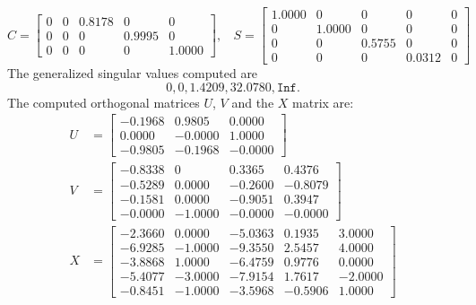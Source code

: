 \begin{example}
{\begin{enumerate}[(1).]
            \begin{equation*}
                C = \begin{bmatrix}
                    0 & 0 & 0.8178 & 0 & 0 \\
                    0 & 0 & 0 & 0.9995 & 0 \\
                    0 & 0 & 0 & 0 & 1.0000
                \end{bmatrix}, \ \ \ \
                S = \begin{bmatrix}
                    1.0000 & 0 & 0 & 0 & 0 \\
                    0 & 1.0000 & 0 & 0 & 0 \\
                    0 & 0 & 0.5755 & 0 & 0 \\
                    0 & 0 & 0 & 0.0312 & 0
                \end{bmatrix}
            \end{equation*}
            The generalized singular values computed are 
\[
0, 0, 1.4209, 32.0780, \texttt{Inf}.
\] 
The computed orthogonal matrices $U$, $V$ and the $X$ matrix are:
            \begin{align*}
                U &= \begin{bmatrix}
                   -0.1968 &  0.9805 &  0.0000 \\
                    0.0000 & -0.0000 &  1.0000 \\
                   -0.9805 & -0.1968 & -0.0000
                \end{bmatrix} 
                \\
                V &= \begin{bmatrix}
                   -0.8338  &       0 &   0.3365  &  0.4376 \\
                   -0.5289  &  0.0000 &  -0.2600  & -0.8079 \\
                   -0.1581  &  0.0000 &  -0.9051  &  0.3947 \\
                   -0.0000  & -1.0000 &  -0.0000  & -0.0000 
                \end{bmatrix} 
                \\ 
                X &= \begin{bmatrix}
                   -2.3660  &  0.0000 &  -5.0363  &  0.1935 &   3.0000 \\
                   -6.9285  & -1.0000 &  -9.3550  &  2.5457 &   4.0000 \\
                   -3.8868  &  1.0000 &  -6.4759  &  0.9776 &   0.0000 \\
                   -5.4077  & -3.0000 &  -7.9154  &  1.7617 &  -2.0000 \\
                   -0.8451  & -1.0000 &  -3.5968  & -0.5906 &   1.0000
                \end{bmatrix}
           \end{align*}


\end{enumerate}}
\end{example}
